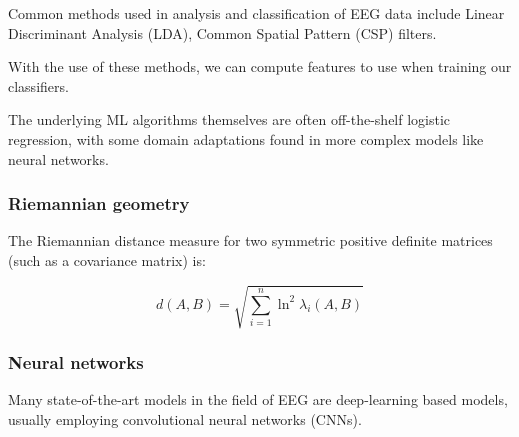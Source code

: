     Common methods used in analysis and classification of EEG data include Linear Discriminant Analysis (LDA), Common Spatial Pattern (CSP) filters.

    With the use of these methods, we can compute features to use when training our classifiers.

    The underlying ML algorithms themselves are often off-the-shelf logistic regression, with some domain adaptations found in more complex models like neural networks.


    \subsubsection{Riemannian geometry}


        The Riemannian distance measure for two symmetric positive definite matrices (such as a covariance matrix) is:~\cite{grafarend_metric_2003}

        \[ d(A, B) = \sqrt{\sum_{i=1}^{n} \ln^2 \lambda_i (A, B) } \]

    \subsubsection{Neural networks}

        Many state-of-the-art models in the field of EEG are deep-learning based models, usually employing convolutional neural networks (CNNs).
